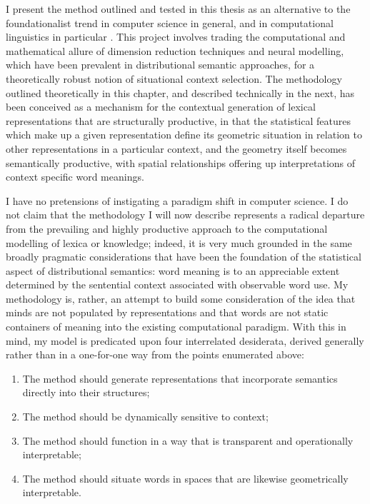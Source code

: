 I present the method outlined and tested in this thesis as an alternative to the foundationalist trend in computer science in general, and in computational linguistics in particular \citep[see][for a robust philosophical criticism of the idea that concepts are stable]{Rorty1979}.  This project involves trading the computational and mathematical allure of dimension reduction techniques and neural modelling, which have been prevalent in distributional semantic approaches, for a theoretically robust notion of situational context selection.  The methodology outlined theoretically in this chapter, and described technically in the next, has been conceived as a mechanism for the contextual generation of lexical representations that are structurally productive, in that the statistical features which make up a given representation define its geometric situation in relation to other representations in a particular context, and the geometry itself becomes semantically productive, with spatial relationships offering up interpretations of context specific word meanings.

I have no pretensions of instigating a paradigm shift in computer science.  I do not claim that the methodology I will now describe represents a radical departure from the prevailing and highly productive approach to the computational modelling of lexica or knowledge; indeed, it is very much grounded in the same broadly pragmatic considerations that have been the foundation of the statistical aspect of distributional semantics: word meaning is to an appreciable extent determined by the sentential context associated with observable word use.  My methodology is, rather, an attempt to build some consideration of the idea that minds are not populated by representations and that words are not static containers of meaning into the existing computational paradigm.  With this in mind, my model is predicated upon four interrelated desiderata, derived generally rather than in a one-for-one way from the points enumerated above:

\begin{enumerate}
\item The method should generate representations that incorporate semantics directly into their structures;
\item The method should be dynamically sensitive to context;
\item The method should function in a way that is transparent and operationally interpretable;
\item The method should situate words in spaces that are likewise geometrically interpretable.
\end{enumerate}

